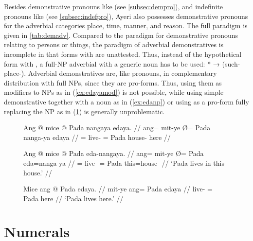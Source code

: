 Besides demonstrative pronouns like  (see
\autoref{subsec:dempro}), and indefinite pronouns like
 (see
\autoref{subsec:indefpro}), Ayeri also possesses demonstrative pronouns for the
adverbial categories place, time, manner, and reason. The full paradigm is
given in \autoref{tab:demadv}. Compared to the paradigm for demonstrative
pronouns relating to persons or things, the paradigm of adverbial
demonstratives is incomplete in that forms with
 are unattested. Thus, instead of the hypothetical form
with , a full-NP adverbial with a generic noun has to be used:
* → 
(such-place-\Loc{}). Adverbial demonstratives are, like pronouns, in
complementary distribution with full NPs, since they are pro-forms. Thus, using
them as modifiers to NPs as in (\ref{ex:edayamod}) is not possible, while using
simple demonstrative  together with a noun as in
(\ref{ex:edanp}) or using  as a pro-form fully replacing
the NP  as in (\ref{ex:edanyapro}) is
generally unproblematic.

\begin{figure}[h]
\pex
\a\ljudge*\label{ex:edayamod}\begingl
	\gla Ang @ mice {} @ Pada nangaya edaya. //
	\glb ang= mit-ye Ø= Pada nanga-ya edaya //
	\glc \AgtT{}= live-\TsgF{} \Top{}= Pada house-\Loc{} here //
\endgl

\a\label{ex:edanp}\begingl
	\gla Ang @ mice {} @ Pada eda-nangaya. //
	\glb ang= mit-ye Ø= Pada eda=nanga-ya //
	\glc \AgtT{}= live-\TsgF{} \Top{}= Pada this=house-\Loc{} //
	\glft `Pada lives in this house.' //
\endgl

\a\label{ex:edanyapro}\begingl
	\gla Mice ang @ Pada edaya. //
	\glb mit-ye ang= Pada edaya //
	\glc live-\TsgF{} \Aarg{}= Pada here //
	\glft `Pada lives here.' //
\endgl
\xe
\end{figure}


\section{Numerals}
\label{sec:numerals}

